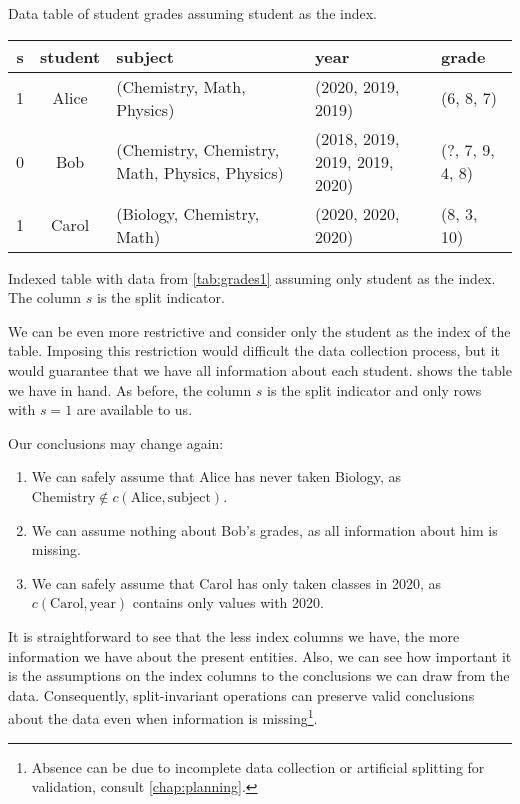 \begin{tablebox}[label=tab:grades3]{Data table of student grades assuming student as the index.}
  \centering
  \begin{tabular}{ccp{2.6cm}p{1.8cm}>{\raggedright\arraybackslash}p{1.2cm}}
    \toprule
    \textbf{s} & \textbf{student} & \textbf{subject} & \textbf{year} & \textbf{grade} \\
    \midrule
    1 & Alice & (Chemistry, Math, Physics) & (2020, 2019, 2019) & (6, 8, 7) \\
    0 & Bob & (Chemistry, Chemistry, Math, Physics, Physics) & (2018, 2019, 2019, 2019, 2020) & (?, 7, 9, 4, 8) \\
    1 & Carol & (Biology, Chemistry, Math) & (2020, 2020, 2020) & (8, 3, 10) \\
    \bottomrule
  \end{tabular}
  \tcblower
  Indexed table with data from \cref{tab:grades1} assuming only student
  as the index.  The column $s$ is the split indicator.
\end{tablebox}

We can be even more restrictive and consider only the student as the index of the table.
Imposing this restriction would difficult the data collection process, but it would
guarantee that we have all information about each student.   shows the
table we have in hand.  As before, the column $s$ is the split indicator and only rows with
$s = 1$ are available to us.

Our conclusions may change again:
\begin{enumerate}
  \itemsep0em
  \item We can safely assume that Alice has never taken Biology, as $\text{Chemistry}
    \not\in c(\text{Alice}, \text{subject})$.
  \item We can assume nothing about Bob's grades, as all information about him is missing.
  \item We can safely assume that Carol has only taken classes in 2020, as $c(\text{Carol},
    \text{year})$ contains only values with 2020.
\end{enumerate}

It is straightforward to see that the less index columns we have, the more information we
have about the present entities.  Also, we can see how important it is the assumptions on
the index columns to the conclusions we can draw from the data.  Consequently,
split-invariant operations can preserve valid conclusions about the data even when
information is missing\footnote{Absence can be due to incomplete data collection or
artificial splitting for validation, consult \cref{chap:planning}.}.

